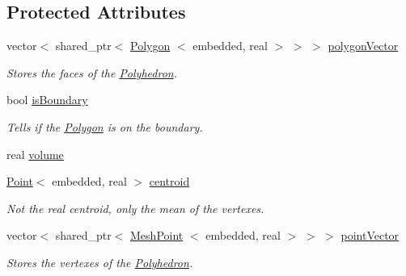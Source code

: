 \subsection*{\-Protected \-Attributes}
\begin{DoxyCompactItemize}
\item 
\hypertarget{class_polyhedron_a5079e0df2333cd47e4aa81be382dde10}{vector$<$ shared\-\_\-ptr$<$ \hyperlink{class_polygon}{\-Polygon}\*
$<$ embedded, real $>$ $>$ $>$ \hyperlink{class_polyhedron_a5079e0df2333cd47e4aa81be382dde10}{polygon\-Vector}}\label{class_polyhedron_a5079e0df2333cd47e4aa81be382dde10}

\begin{DoxyCompactList}\small\item\em \-Stores the faces of the \hyperlink{class_polyhedron}{\-Polyhedron}. \end{DoxyCompactList}\item 
\hypertarget{class_polyhedron_a6ecb308fce1a68cb3cec39c71fe98ddd}{bool \hyperlink{class_polyhedron_a6ecb308fce1a68cb3cec39c71fe98ddd}{is\-Boundary}}\label{class_polyhedron_a6ecb308fce1a68cb3cec39c71fe98ddd}

\begin{DoxyCompactList}\small\item\em \-Tells if the \hyperlink{class_polygon}{\-Polygon} is on the boundary. \end{DoxyCompactList}\item 
real \hyperlink{class_polyhedron_a0f4ab3ccfdc65071201bdb0b55c2b683}{volume}
\item 
\hyperlink{class_point}{\-Point}$<$ embedded, real $>$ \hyperlink{class_polyhedron_ab7839d59898be24bb956fc41d1c66096}{centroid}
\begin{DoxyCompactList}\small\item\em \-Not the real centroid, only the mean of the vertexes. \end{DoxyCompactList}\item 
\hypertarget{class_polyhedron_afda67d1ac832dd4a04539b26aa1ca3f6}{vector$<$ shared\-\_\-ptr$<$ \hyperlink{class_mesh_point}{\-Mesh\-Point}\*
$<$ embedded, real $>$ $>$ $>$ \hyperlink{class_polyhedron_afda67d1ac832dd4a04539b26aa1ca3f6}{point\-Vector}}\label{class_polyhedron_afda67d1ac832dd4a04539b26aa1ca3f6}

\begin{DoxyCompactList}\small\item\em \-Stores the vertexes of the \hyperlink{class_polyhedron}{\-Polyhedron}. \end{DoxyCompactList}\end{DoxyCompactItemize}
